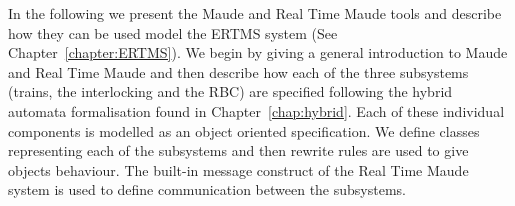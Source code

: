 \newcommand{\rtmaude}{Real Time Maude}
\label{chap:modelertms}
In the following we present the Maude \cite{MC03,Maude} and Real Time Maude \cite{PO02,PO04,RTMaude} tools and describe how they can be used model the ERTMS system (See Chapter~\ref{chapter:ERTMS}).   We begin by giving a general introduction to Maude and Real Time Maude and then describe how each of the three subsystems (trains, the interlocking and the RBC) are specified following the hybrid automata formalisation found in Chapter~\ref{chap:hybrid}. Each of these individual components is modelled as an object oriented specification. We define classes representing each of the subsystems and then rewrite rules are used to give objects behaviour. The  built-in message construct of the Real Time Maude system is used to define communication between the subsystems.

